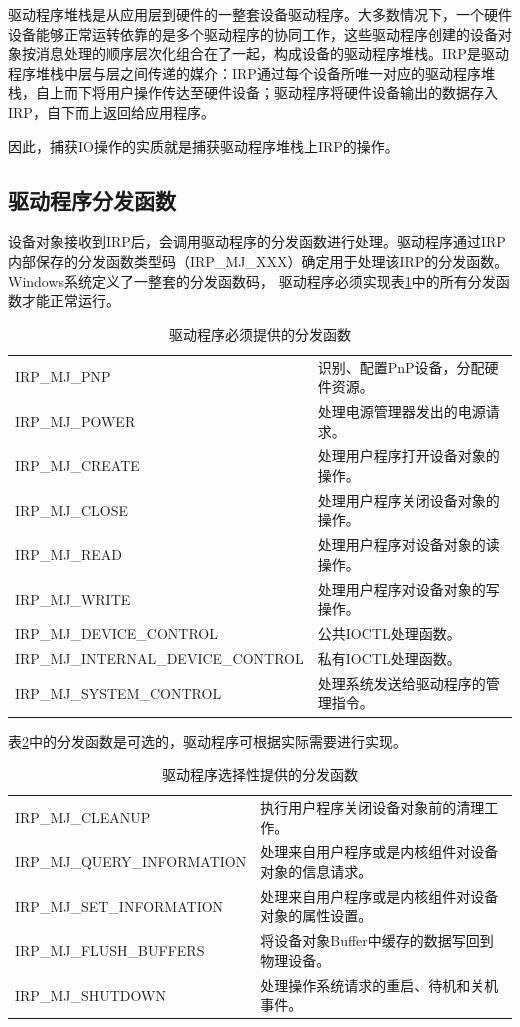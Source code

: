 驱动程序堆栈是从应用层到硬件的一整套设备驱动程序。大多数情况下，一个硬件设备能够正常运转依靠的是多个驱动程序的协同工作，这些驱动程序创建的设备对象按消息处理的顺序层次化组合在了一起，构成设备的驱动程序堆栈。IRP是驱动程序堆栈中层与层之间传递的媒介：IRP通过每个设备所唯一对应的驱动程序堆栈，自上而下将用户操作传达至硬件设备；驱动程序将硬件设备输出的数据存入IRP，自下而上返回给应用程序。

因此，捕获IO操作的实质就是捕获驱动程序堆栈上IRP的操作。

\subsection{驱动程序分发函数}
设备对象接收到IRP后，会调用驱动程序的分发函数进行处理。驱动程序通过IRP内部保存的分发函数类型码（IRP\_MJ\_XXX）确定用于处理该IRP的分发函数。Windows系统定义了一整套的分发函数码，
驱动程序必须实现表\ref{tab:must-handled-major-function}中的所有分发函数才能正常运行。

\begin{table}[H]
\centering
\caption{驱动程序必须提供的分发函数}
\begin{tabular}{|ll|}
\hline IRP\_MJ\_PNP  & 识别、配置PnP设备，分配硬件资源。 \\
       IRP\_MJ\_POWER & 处理电源管理器发出的电源请求。 \\
       IRP\_MJ\_CREATE & 处理用户程序打开设备对象的操作。 \\
       IRP\_MJ\_CLOSE & 处理用户程序关闭设备对象的操作。 \\
       IRP\_MJ\_READ & 处理用户程序对设备对象的读操作。 \\
       IRP\_MJ\_WRITE & 处理用户程序对设备对象的写操作。 \\
       IRP\_MJ\_DEVICE\_CONTROL & 公共IOCTL处理函数。 \\
       IRP\_MJ\_INTERNAL\_DEVICE\_CONTROL & 私有IOCTL处理函数。 \\
       IRP\_MJ\_SYSTEM\_CONTROL & 处理系统发送给驱动程序的管理指令。 \\
\hline
\end{tabular}
\label{tab:must-handled-major-function}
\end{table}

表\ref{tab:option-handled-major-function}中的分发函数是可选的，驱动程序可根据实际需要进行实现。
\begin{table}[H]
\centering
\caption{驱动程序选择性提供的分发函数}
\begin{tabular}{|ll|}
\hline IRP\_MJ\_CLEANUP & 执行用户程序关闭设备对象前的清理工作。 \\
       IRP\_MJ\_QUERY\_INFORMATION & 处理来自用户程序或是内核组件对设备对象的信息请求。 \\
       IRP\_MJ\_SET\_INFORMATION & 处理来自用户程序或是内核组件对设备对象的属性设置。 \\
       IRP\_MJ\_FLUSH\_BUFFERS & 将设备对象Buffer中缓存的数据写回到物理设备。 \\
       IRP\_MJ\_SHUTDOWN & 处理操作系统请求的重启、待机和关机事件。 \\
\hline
\end{tabular}
\label{tab:option-handled-major-function}
\end{table}

